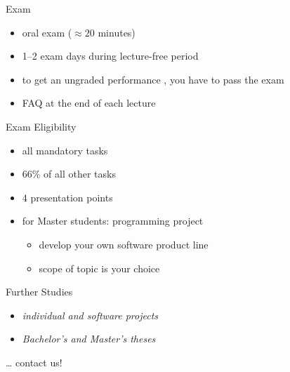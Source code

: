 \begin{frame}[label=Exam]{\myframetitle}
	\begin{fancycolumns}
		\begin{definition}{Exam}
			\begin{itemize}
				\item oral exam ($\approx 20$ minutes)
				\item 1--2 exam days during lecture-free period
				\item to get an ungraded performance , you have to pass the exam
				\item FAQ at the end of each lecture
			\end{itemize}
		\end{definition}
		\begin{definition}{Exam Eligibility }
			\begin{itemize}
				\item all mandatory tasks
				\item 66\% of all other tasks 
				\item 4 presentation points 
				\item for Master students: programming project
				\begin{itemize}
					\item develop your own software product line
					\item scope of topic is your choice
				\end{itemize}
			\end{itemize}
		\end{definition}
	\nextcolumn
		\begin{note}{Further Studies}
			\begin{itemize}
				\item \emph{individual and software projects}
				\item \emph{Bachelor's and Master's theses}
			\end{itemize}
			\ldots{} contact us!
		\end{note}
	\end{fancycolumns}
\end{frame}
